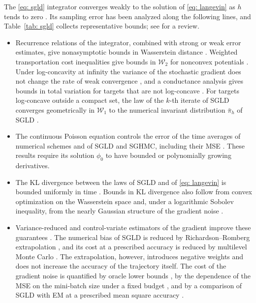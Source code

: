 \documentclass{article}
\numberwithin{equation}{section}
\begin{document}
The \eqref{eq: sgld} integrator converges weakly to the solution of \eqref{eq: langevin} as $h$ tends to zero \citep{sato2014approximation}. Its sampling error has been analyzed along the following lines, and Table~\ref{tab: sgld} collects representative bounds; see \citep{nemeth2021stochastic} for a review.
\begin{itemize}
	\setlength{\itemsep}{0pt}
	\item Recurrence relations of the integrator, combined with strong or weak error estimates, give nonasymptotic bounds in Wasserstein distance \citep{dalalyan2017user, nagapetyan2017true, brosse2018promises, barkhagen2021stochastic, chau2021stochastic, zhang2023nonasymptotic, shaw2025random}. Weighted transportation cost inequalities give bounds in $\mathcal W_2$ for nonconvex potentials \citep{raginsky2017nonconvex}. Under log-concavity at infinity the variance of the stochastic gradient does not change the rate of weak convergence \citep{majka2020nonasymptotic}, and a conductance analysis gives bounds in total variation for targets that are not log-concave \citep{zou2021faster}. For targets log-concave outside a compact set, the law of the $k$-th iterate of SGLD converges geometrically in $\mathcal W_1$ to the numerical invariant distribution $\bar\pi_h$ of SGLD \citep{li2024geometric}.
	\item The continuous Poisson equation controls the error of the time averages of numerical schemes \citep{mattingly2010convergence, brosse2019tamed} and of SGLD and SGHMC, including their MSE \citep{chen2015convergence, teh2016consistency, vollmer2016exploration, xu2018global, li2023improving}. These results require its solution $\phi_0$ to have bounded or polynomially growing derivatives.
	\item The KL divergence between the laws of SGLD and of \eqref{eq: langevin} is bounded uniformly in time \citep{li2022sharp}. Bounds in KL divergence also follow from convex optimization on the Wasserstein space \citep{durmus2019analysis} and, under a logarithmic Sobolev inequality, from the nearly Gaussian structure of the gradient noise \citep{das2023utilising}.
	\item Variance-reduced and control-variate estimators of the gradient improve these guarantees \citep{dubey2016variance, chatterji2018theory, baker2019control, zou2019sampling, kinoshita2022improved}. The numerical bias of SGLD is reduced by Richardson--Romberg extrapolation \citep{durmus2016stochastic}, and its cost at a prescribed accuracy is reduced by multilevel Monte Carlo \citep{giles2016multilevel, giles2020multilevel}. The extrapolation, however, introduces negative weights and does not increase the accuracy of the trajectory itself. The cost of the gradient noise is quantified by oracle lower bounds \citep{chatterji2022oracle}, by the dependence of the MSE on the mini-batch size under a fixed budget \citep{chen2019convergence}, and by a comparison of SGLD with EM at a prescribed mean square accuracy \citep{majka2026computational}.
\end{itemize}
\end{document}
